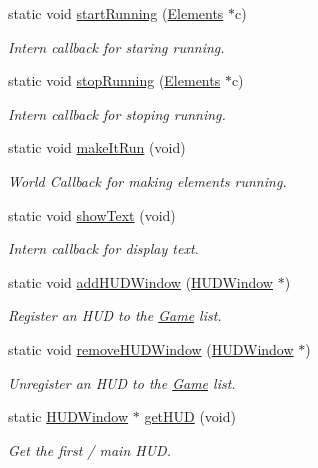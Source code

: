 \begin{DoxyCompactItemize}
static void \hyperlink{class_game_a27ad8f2a6f8f098cc28377df13c4ec2e}{start\-Running} (\hyperlink{class_elements}{Elements} $\ast$c)
\begin{DoxyCompactList}\small\item\em Intern callback for staring running. \end{DoxyCompactList}\item 
static void \hyperlink{class_game_a9394f6f0c90bde35fb0bd4ca3316c3f0}{stop\-Running} (\hyperlink{class_elements}{Elements} $\ast$c)
\begin{DoxyCompactList}\small\item\em Intern callback for stoping running. \end{DoxyCompactList}\item 
static void \hyperlink{class_game_ae763ecd953645a586b638a46b908ca5a}{make\-It\-Run} (void)
\begin{DoxyCompactList}\small\item\em World Callback for making elements running. \end{DoxyCompactList}\item 
static void \hyperlink{class_game_a5cf54b4cf9d8bf024f8936fedf11ccea}{show\-Text} (void)
\begin{DoxyCompactList}\small\item\em Intern callback for display text. \end{DoxyCompactList}\item 
static void \hyperlink{class_game_a88d713d54d9303c38c897635c7c04cf4}{add\-H\-U\-D\-Window} (\hyperlink{class_h_u_d_window}{H\-U\-D\-Window} $\ast$)
\begin{DoxyCompactList}\small\item\em Register an H\-U\-D to the \hyperlink{class_game}{Game} list. \end{DoxyCompactList}\item 
static void \hyperlink{class_game_a80e17eab80071411eff5eb38d6b7fc76}{remove\-H\-U\-D\-Window} (\hyperlink{class_h_u_d_window}{H\-U\-D\-Window} $\ast$)
\begin{DoxyCompactList}\small\item\em Unregister an H\-U\-D to the \hyperlink{class_game}{Game} list. \end{DoxyCompactList}\item 
static \hyperlink{class_h_u_d_window}{H\-U\-D\-Window} $\ast$ \hyperlink{class_game_a8339342d69fc241d349da9404ce088c5}{get\-H\-U\-D} (void)
\begin{DoxyCompactList}\small\item\em Get the first / main H\-U\-D. \end{DoxyCompactList}\end{DoxyCompactItemize}
